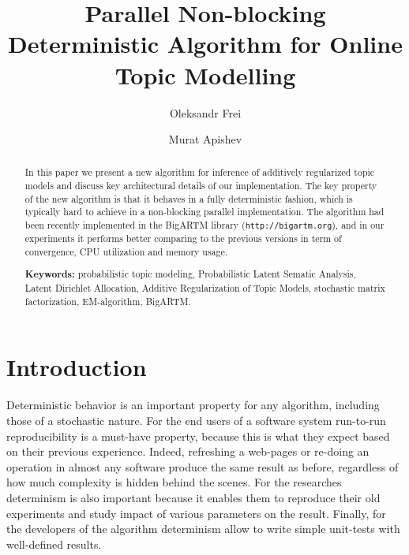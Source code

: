 \documentclass[russian,english]{llncs}
\begin{document}
\title{
    Parallel Non-blocking Deterministic Algorithm for Online Topic Modelling
}
\author{
    Oleksandr Frei
    \and
    Murat Apishev
}

\maketitle

\begin{abstract}
In this paper we present a new algorithm for inference of additively regularized topic models
and discuss key architectural details of our implementation.
The key property of the new algorithm is that it behaves in a fully deterministic fashion,
which is typically hard to achieve in a non-blocking parallel implementation.
The algorithm had been recently implemented in the BigARTM library (\texttt{http://bigartm.org}),
and in our experiments it performs better comparing to the previous versions in term of convergence,
CPU utilization and memory usage.

\vspace{1em}
\textbf{Keywords:}
    probabilistic topic modeling,
    Probabilistic Latent Sematic Analysis,
    Latent Dirichlet Allocation,
    Additive Regularization of Topic Models,
    stochastic matrix factorization,
    EM-algorithm,
    BigARTM.
\end{abstract}

\section{Introduction}

Deterministic behavior is an important property for any algorithm,
including those of a stochastic nature.
For the end users of a software system run-to-run reproducibility is a must-have property,
because this is what they expect based on their previous experience.
Indeed, refreshing a web-pages or re-doing an operation in almost any software
produce the same result as before, regardless of how much complexity is hidden behind the scenes.
For the researches determinism is also important
because it enables them to reproduce their old experiments
and study impact of various parameters on the result.
Finally, for the developers of the algorithm
determinism allow to write simple unit-tests with well-defined results.
\end{document}
